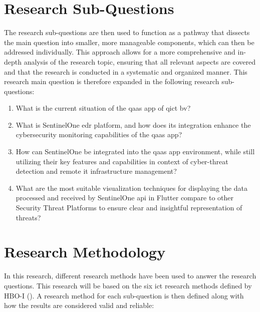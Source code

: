 \begin{multicols}{2}
      \section{Research Sub-Questions}
      The research sub-questions are then used to function as a pathway that dissects the main
      question into smaller, more manageable components, which can then be addressed individually. This approach
      allows for a more comprehensive and in-depth analysis of the research topic, ensuring that all relevant
      aspects are covered and that the research is conducted in a systematic and organized manner.
      This research main question is therefore expanded in the following research sub-questions:
      \begin{enumerate}
            \item What is the current situation of the \acrshort{qaas} app of \acrlong{qict} \acrshort{bv}?
            \item What is SentinelOne \acrshort{edr} platform, and how does its integration enhance the cybersecurity
                  monitoring capabilities of the \acrshort{qaas} app?
            \item How can SentinelOne be integrated into the \acrshort{qaas} app environment, while still
                  utilizing their key features and capabilities in context of cyber-threat detection and
                  remote \acrshort{it} infrastructure management?
            \item What are the most suitable visualization techniques for displaying the data processed and
                  received by  SentinelOne \acrshort{api} in Flutter compare to other Security Threat Platforms to
                  ensure clear and insightful representation of threats?
      \end{enumerate}
      \section{Research Methodology}
      In this research, different research methods have been used to answer the research questions. This research
      will be based on the six \acrshort{ict} research methods defined by HBO-I (\cite{ictresearchmethods}). A
      research method for each sub-question is then defined along with how the results are considered valid and
      reliable:

\end{multicols}
